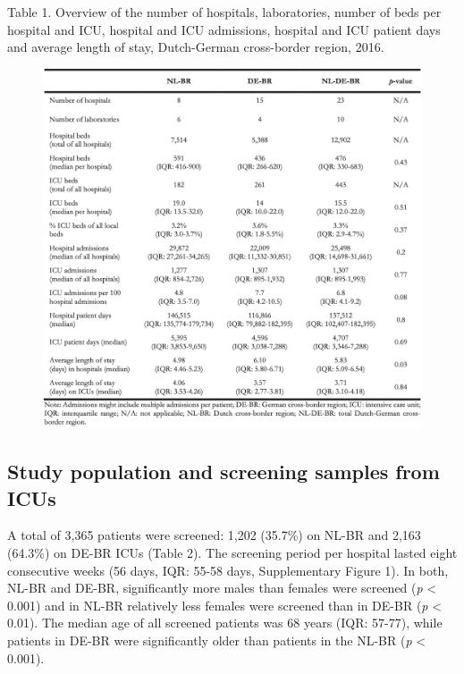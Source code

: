 \documentclass[
]{book}
\begin{document}
Table 1. Overview of the number of hospitals, laboratories, number of beds per hospital and ICU, hospital and ICU admissions, hospital and ICU patient days and average length of stay, Dutch-German cross-border region, 2016.

\begin{figure}

{\centering \includegraphics[width=1\linewidth]{images/10-t01} 

}

\end{figure}

\hypertarget{study-population-and-screening-samples-from-icus}{%
\subsection{Study population and screening samples from ICUs}\label{study-population-and-screening-samples-from-icus}}

A total of 3,365 patients were screened: 1,202 (35.7\%) on NL-BR and 2,163 (64.3\%) on DE-BR ICUs (Table 2). The screening period per hospital lasted eight consecutive weeks (56 days, IQR: 55-58 days, Supplementary Figure 1). In both, NL-BR and DE-BR, significantly more males than females were screened (\emph{p} \textless{} 0.001) and in NL-BR relatively less females were screened than in DE-BR (\emph{p} \textless{} 0.01). The median age of all screened patients was 68 years (IQR: 57-77), while patients in DE-BR were significantly older than patients in the NL-BR (\emph{p} \textless{} 0.001).
\end{document}
